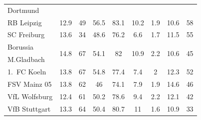 \begin{table}[t]
\begin{tabular}{lccccccc|c}
Dortmund      &                              &                              &                                  &                          &                                 &                                 &                               &                         \\
RB Leipzig    & \multicolumn{1}{c}{12.9}     & \multicolumn{1}{c}{49}       & \multicolumn{1}{c}{56.5}         & \multicolumn{1}{c}{83.1} & \multicolumn{1}{c}{10.2}        & \multicolumn{1}{c}{1.9}         & \multicolumn{1}{c|}{10.6}     & \multicolumn{1}{c}{58}  \\
SC Freiburg      & \multicolumn{1}{c}{13.6}     & \multicolumn{1}{c}{34}       & \multicolumn{1}{c}{48.6}         & \multicolumn{1}{c}{76.2} & \multicolumn{1}{c}{6.6}         & \multicolumn{1}{c}{1.7}         & \multicolumn{1}{c|}{11.5}     & \multicolumn{1}{c}{55}  \\
Borussia      & \multirow{2}{*}{14.8}        & \multirow{2}{*}{67}          & \multirow{2}{*}{54.1}            & \multirow{2}{*}{82}      & \multirow{2}{*}{10.9}           & \multirow{2}{*}{2.2}            & \multirow{2}{*}{10.6}         & \multirow{2}{*}{45}     \\
M.Gladbach    &                              &                              &                                  &                          &                                 &                                 &                               &                         \\
1.~FC Koeln       & \multicolumn{1}{c}{13.8}     & \multicolumn{1}{c}{67}       & \multicolumn{1}{c}{54.8}         & \multicolumn{1}{c}{77.4} & \multicolumn{1}{c}{7.4}         & \multicolumn{1}{c}{2}           & \multicolumn{1}{c|}{12.3}     & \multicolumn{1}{c}{52}  \\
FSV Mainz 05       & \multicolumn{1}{c}{13.8}     & \multicolumn{1}{c}{62}       & \multicolumn{1}{c}{46}           & \multicolumn{1}{c}{74.1} & \multicolumn{1}{c}{7.9}         & \multicolumn{1}{c}{1.9}         & \multicolumn{1}{c|}{14.6}     & \multicolumn{1}{c}{46}  \\
VfL Wolfsburg     & \multicolumn{1}{c}{12.4}     & \multicolumn{1}{c}{61}       & \multicolumn{1}{c}{50.2}         & \multicolumn{1}{c}{78.6} & \multicolumn{1}{c}{9.4}         & \multicolumn{1}{c}{2.2}         & \multicolumn{1}{c|}{12.1}     & \multicolumn{1}{c}{42}  \\
VfB Stuttgart & \multicolumn{1}{c}{13.3}     & \multicolumn{1}{c}{64}       & \multicolumn{1}{c}{50.4}         & \multicolumn{1}{c}{80.7} & \multicolumn{1}{c}{11}          & \multicolumn{1}{c}{1.6}         & \multicolumn{1}{c|}{10.9}     & \multicolumn{1}{c}{33}  \\

\end{tabular}
\end{table}
